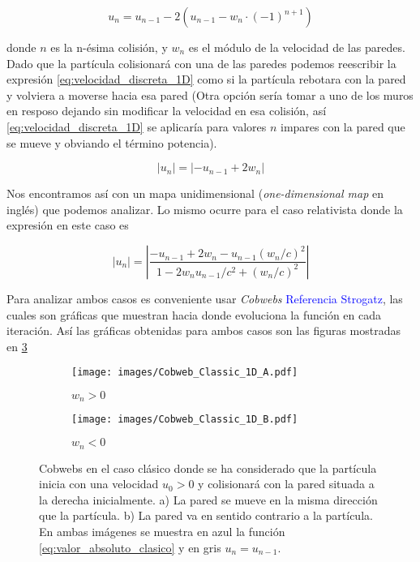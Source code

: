 \documentclass[11pt, spanish]{book}
\begin{document}
\begin{equation}\label{eq:velocidad_discreta_1D}
    u_n = u_{n-1} - 2\left( u_{n-1} - w_n \cdot (-1)^{n+1} \right)
\end{equation}

donde \( n \) es la n-ésima colisión, y \( w_n \) es el módulo de la velocidad de las paredes. Dado que la partícula colisionará con una de las paredes podemos reescribir la expresión \ref{eq:velocidad_discreta_1D} como si la partícula rebotara con la pared y volviera a moverse hacia esa pared (Otra opción sería tomar a uno de los muros en resposo dejando sin modificar la velocidad en esa colisión, así \ref{eq:velocidad_discreta_1D} se aplicaría para valores \( n \) impares con la pared que se mueve y obviando el término potencia). 

\begin{equation}\label{eq:valor_absoluto_clasico}
    \left| u_n \right| =\left| -u_{n-1} + 2w_n \right|
\end{equation}

Nos encontramos así con un mapa unidimensional (\textit{one-dimensional map} en inglés) que podemos analizar. Lo mismo ocurre para el caso relativista donde la expresión en este caso es

\begin{equation}\label{eq:valor_absoluto_relativista}
    \left| u_n \right| = \left|  \dfrac{-u_{n-1} + 2w_n - u_{n-1}(w_n/c)^2}{1 - 2w_n u_{n-1}/c^2 + (w_n/c)^2} \right|
\end{equation}

Para analizar ambos casos es conveniente usar \cite{Strogatz} \textit{Cobwebs} \textcolor{blue}{Referencia Strogatz}, las cuales son gráficas que muestran hacia donde evoluciona la función en cada iteración. Así las gráficas obtenidas para ambos casos son las figuras mostradas en \ref{fig:Cobweb_Classic_1D}

\begin{figure}[H]
    \centering
    \begin{subfigure}[b]{0.49\textwidth}
        \centering
        \texttt{[image: images/Cobweb\_Classic\_1D\_A.pdf]}
        \caption{$w_n>0$}
        \label{fig:Cobweb_Classic_1D_A}
    \end{subfigure}
    \hfill
    \begin{subfigure}[b]{0.49\textwidth}
        \centering
        \texttt{[image: images/Cobweb\_Classic\_1D\_B.pdf]}
        \caption{$w_n<0$}
        \label{fig:Cobweb_Classic_1D_B}
    \end{subfigure}
    \caption{Cobwebs en el caso clásico donde se ha considerado que la partícula inicia con una velocidad $u_0 > 0$ y colisionará con la pared situada a la derecha inicialmente. a) La pared se mueve en la misma dirección que la partícula. b) La pared va en sentido contrario a la partícula. En ambas imágenes se muestra en azul la función \ref{eq:valor_absoluto_clasico} y en gris \( u_n = u_{n-1} \).}
        \label{fig:Cobweb_Classic_1D}
\end{figure}
\end{document}
